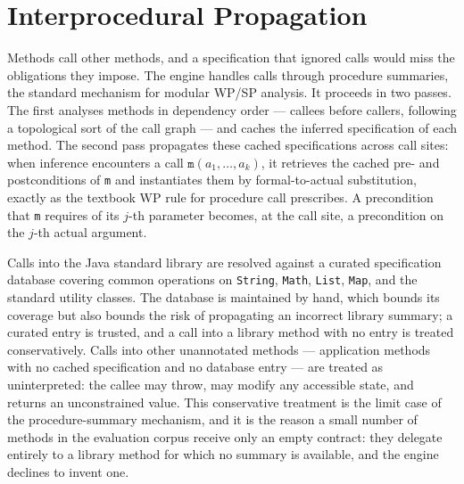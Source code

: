 \section{Interprocedural Propagation}
\label{sec:inf-inter}

Methods call other methods, and a specification that ignored calls would miss
the obligations they impose. The engine handles calls through procedure
summaries, the standard mechanism for modular WP/SP analysis. It proceeds in
two passes. The first analyses methods in dependency order --- callees before
callers, following a topological sort of the call graph --- and caches the
inferred specification of each method. The second pass propagates these cached
specifications across call sites: when inference encounters a call
$\mathtt{m}(a_1, \dots, a_k)$, it retrieves the cached pre- and postconditions
of \texttt{m} and instantiates them by formal-to-actual substitution, exactly
as the textbook WP rule for procedure call prescribes. A precondition that
\texttt{m} requires of its $j$-th parameter becomes, at the call site, a
precondition on the $j$-th actual argument.

Calls into the Java standard library are resolved against a curated
specification database covering common operations on \texttt{String},
\texttt{Math}, \texttt{List}, \texttt{Map}, and the standard utility classes.
The database is maintained by hand, which bounds its coverage but also bounds
the risk of propagating an incorrect library summary; a curated entry is
trusted, and a call into a library method with no entry is treated
conservatively. Calls into other unannotated methods --- application methods
with no cached specification and no database entry --- are treated as
uninterpreted: the callee may throw, may modify any accessible state, and
returns an unconstrained value. This conservative treatment is the limit case
of the procedure-summary mechanism, and it is the reason a small number of
methods in the evaluation corpus receive only an empty contract: they delegate
entirely to a library method for which no summary is available, and the engine
declines to invent one.

